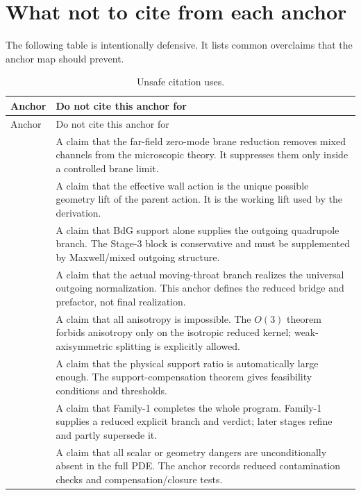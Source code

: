 \section{What not to cite from each anchor}
\label{sec:what-not-to-cite}

The following table is intentionally defensive.  It lists common overclaims that the anchor map should prevent.

\begin{longtable}{L{0.16\textwidth}L{0.74\textwidth}}
\caption{Unsafe citation uses.}\label{tab:unsafe-anchor-uses}\\
\toprule
Anchor & Do not cite this anchor for \\
\midrule
\endfirsthead
\toprule
Anchor & Do not cite this anchor for \\
\midrule
\endhead
{} & A claim that the far-field zero-mode brane reduction removes mixed channels from the microscopic theory.  It suppresses them only inside a controlled brane limit. \\
\addlinespace
{} & A claim that the effective wall action is the unique possible geometry lift of the parent action.  It is the working lift used by the derivation. \\
\addlinespace
{} & A claim that BdG support alone supplies the outgoing quadrupole branch.  The Stage-3 block is conservative and must be supplemented by Maxwell/mixed outgoing structure. \\
\addlinespace
{} & A claim that the actual moving-throat branch realizes the universal outgoing normalization.  This anchor defines the reduced bridge and prefactor, not final realization. \\
\addlinespace
{} & A claim that all anisotropy is impossible.  The \(O(3)\) theorem forbids anisotropy only on the isotropic reduced kernel; weak-axisymmetric splitting is explicitly allowed. \\
\addlinespace
{} & A claim that the physical support ratio is automatically large enough.  The support-compensation theorem gives feasibility conditions and thresholds. \\
\addlinespace
{} & A claim that Family-1 completes the whole program.  Family-1 supplies a reduced explicit branch and verdict; later stages refine and partly supersede it. \\
\addlinespace
{} & A claim that all scalar or geometry dangers are unconditionally absent in the full PDE.  The anchor records reduced contamination checks and compensation/closure tests. \\

\end{longtable}
